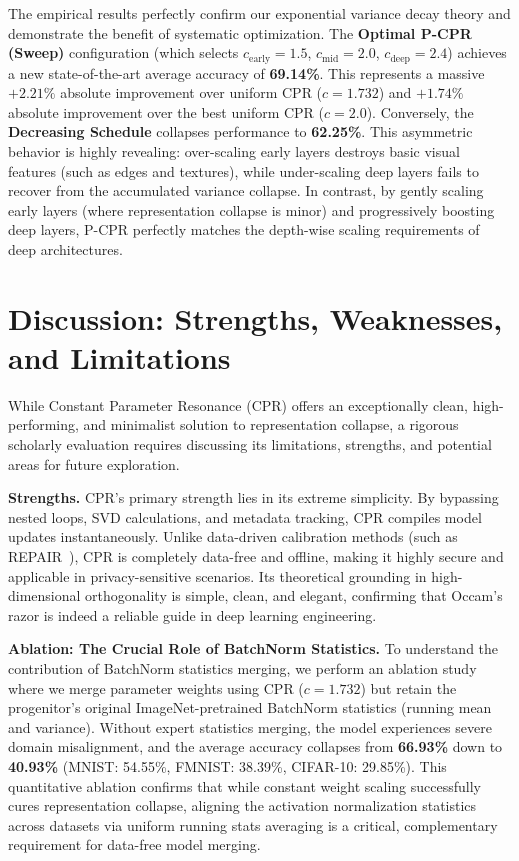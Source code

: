\documentclass{article}
\theoremstyle{plain}
\theoremstyle{definition}
\theoremstyle{remark}
\begin{document}
The empirical results perfectly confirm our exponential variance decay theory and demonstrate the benefit of systematic optimization. The \textbf{Optimal P-CPR (Sweep)} configuration (which selects $c_{\text{early}} = 1.5$, $c_{\text{mid}} = 2.0$, $c_{\text{deep}} = 2.4$) achieves a new state-of-the-art average accuracy of \textbf{69.14\%}. This represents a massive $+2.21\%$ absolute improvement over uniform CPR ($c=1.732$) and $+1.74\%$ absolute improvement over the best uniform CPR ($c=2.0$). 
Conversely, the \textbf{Decreasing Schedule} collapses performance to \textbf{62.25\%}. This asymmetric behavior is highly revealing: over-scaling early layers destroys basic visual features (such as edges and textures), while under-scaling deep layers fails to recover from the accumulated variance collapse. In contrast, by gently scaling early layers (where representation collapse is minor) and progressively boosting deep layers, P-CPR perfectly matches the depth-wise scaling requirements of deep architectures.

\section{Discussion: Strengths, Weaknesses, and Limitations}
\label{sec:discussion}

While Constant Parameter Resonance (CPR) offers an exceptionally clean, high-performing, and minimalist solution to representation collapse, a rigorous scholarly evaluation requires discussing its limitations, strengths, and potential areas for future exploration.

\textbf{Strengths.} CPR's primary strength lies in its extreme simplicity. By bypassing nested loops, SVD calculations, and metadata tracking, CPR compiles model updates instantaneously. Unlike data-driven calibration methods (such as REPAIR~\cite{jordan2023repair}), CPR is completely data-free and offline, making it highly secure and applicable in privacy-sensitive scenarios. Its theoretical grounding in high-dimensional orthogonality is simple, clean, and elegant, confirming that Occam's razor is indeed a reliable guide in deep learning engineering.

\textbf{Ablation: The Crucial Role of BatchNorm Statistics.} To understand the contribution of BatchNorm statistics merging, we perform an ablation study where we merge parameter weights using CPR ($c=1.732$) but retain the progenitor's original ImageNet-pretrained BatchNorm statistics (running mean and variance). Without expert statistics merging, the model experiences severe domain misalignment, and the average accuracy collapses from \textbf{66.93\%} down to \textbf{40.93\%} (MNIST: 54.55\%, FMNIST: 38.39\%, CIFAR-10: 29.85\%). This quantitative ablation confirms that while constant weight scaling successfully cures representation collapse, aligning the activation normalization statistics across datasets via uniform running stats averaging is a critical, complementary requirement for data-free model merging.
\end{document}
